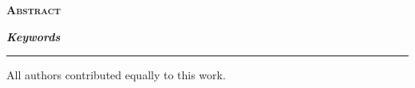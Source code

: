 {\begin{titlepage}
    \par
    \vspace{0.95em}%
    \noindent
    \hfill
    \par
    \vspace{0.95em}%
    {\small\SubmissionDate\par}%
    \vspace{1em}%
    {\normalsize\bfseries\scshape Abstract\par}%
    \vspace{0.75em}%
    \begin{minipage}{0.86\textwidth}%
      \small\justifying
      \setlength{\parindent}{0pt}%
      \setlength{\parskip}{0pt}%
      \ProjectAbstractText

      \vspace{0.9em}%
      \noindent\textbf{\textit{Keywords}}\par
      \noindent\ProjectKeywords
    \end{minipage}%
    \vfill
    \begin{minipage}{\textwidth}%
      \raggedright
      \rule{0.12\textwidth}{0.4pt}\par
      {\scriptsize * All authors contributed equally to this work.\par}%
    \end{minipage}%
  \end{titlepage}%
  \setcounter{footnote}{0}%
}
\makeatother